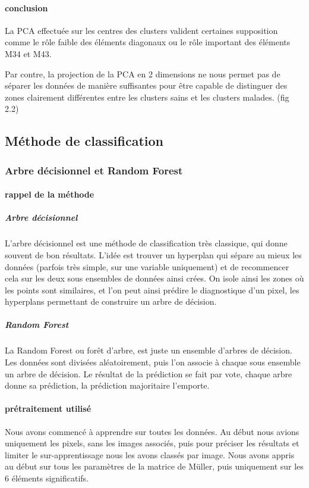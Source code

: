 \documentclass[a4paper,10pt]{report}
\begin{document}
\paragraph{conclusion}
La PCA effectuée sur les centres des clusters valident certaines supposition comme le rôle faible des éléments diagonaux ou le rôle important des éléments M34 et M43.

Par contre, la projection de la PCA en 2 dimensions ne nous permet pas de séparer les données de manière suffisantes pour être capable de distinguer des zones clairement différentes entre les clusters sains et les clusters malades. (fig 2.2)
\subsection{Méthode de classification}

\subsubsection{Arbre décisionnel et Random Forest}
\paragraph{rappel de la méthode }

\subparagraph{Arbre décisionnel} 
L'arbre décisionnel est une méthode de classification très classique, qui donne souvent de bon résultats. L'idée est trouver un hyperplan qui sépare au mieux les données (parfois très simple, sur une variable uniquement) et de recommencer cela sur les deux sous ensembles de données ainsi crées. On isole ainsi les zones où les points sont similaires, et l'on peut ainsi prédire le diagnostique d'un pixel, les hyperplans permettant de construire un arbre de décision.
\subparagraph{Random Forest}
La Random Forest ou forêt d'arbre, est juste un ensemble d'arbres de décision. Les données sont divisées aléatoirement, puis l'on associe à chaque sous ensemble un arbre de décision. Le résultat de la prédiction se fait par vote, chaque arbre donne sa prédiction, la prédiction majoritaire l'emporte.
\paragraph{prétraitement utilisé}
Nous avons commencé à apprendre sur toutes les données. Au début nous avions uniquement les pixels, sans les images associés, puis pour préciser les résultats et limiter le sur-apprentissage nous les avons classés par image. Nous avons appris au début sur tous les paramètres de la matrice de Müller, puis uniquement sur les 6 éléments significatifs.
\end{document}
